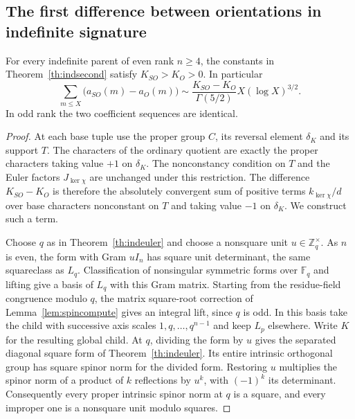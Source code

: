 \subsection{The first difference between orientations in indefinite signature}
\begin{theorem}\label{th:indorient}
For every indefinite parent of even rank \(n\ge4\), the constants in Theorem~\ref{th:indsecond} satisfy \(K_{SO}>K_O>0\). In particular
\[
 \sum_{m\le X}\bigl(a_{SO}(m)-a_O(m)\bigr)
 \sim\frac{K_{SO}-K_O}{\Gamma(5/2)}X(\log X)^{3/2}.
\]
In odd rank the two coefficient sequences are identical.
\end{theorem}
\begin{proof}
At each base tuple use the proper group \(C\), its reversal element \(\delta_K\) and its support \(T\). The characters of the ordinary quotient are exactly the proper characters taking value \(+1\) on \(\delta_K\). The nonconstancy condition on \(T\) and the Euler factors
\(J_{\ker\chi}\) are unchanged under this restriction. The difference \(K_{SO}-K_O\) is therefore the absolutely convergent sum of positive terms \(k_{\ker\chi}/d\) over base characters nonconstant on \(T\) and taking value \(-1\) on \(\delta_K\). We construct such a term.

Choose \(q\) as in Theorem~\ref{th:indeuler} and choose a nonsquare unit \(u\in\mathbb Z_q^\times\). As \(n\) is even, the form with Gram \(uI_n\) has square unit determinant, the same squareclass as \(L_q\). Classification of nonsingular symmetric forms over \(\mathbb F_q\) and lifting give a basis of \(L_q\) with this Gram matrix. Starting from the residue-field congruence modulo \(q\), the
matrix square-root correction of Lemma~\ref{lem:spincompute}
gives an integral lift, since \(q\) is odd. In this basis take the child with successive axis scales \(1,q,\ldots,q^{n-1}\) and keep \(L_p\) elsewhere. Write \(K\) for the resulting global child. At \(q\), dividing the form by \(u\) gives the separated diagonal square form of Theorem~\ref{th:indeuler}. Its entire intrinsic orthogonal group has square spinor norm for the divided form. Restoring \(u\) multiplies the spinor norm of a product of \(k\) reflections by \(u^k\), with \((-1)^k\) its determinant. Consequently every proper intrinsic spinor norm at \(q\) is a square, and every improper one is a nonsquare unit modulo squares.


\end{proof}
